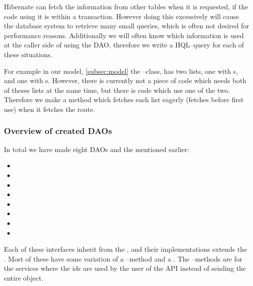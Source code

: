 Hibernate can fetch the information from other tables when it is requested, if the code using it is within a transaction.
However doing this excessively will cause the database system to retrieve many small queries, which is often not desired for performance reasons.
Additionally we will often know which information is used at the caller side of using the \ac{DAO},
therefore we write a \ac{HQL}--query for each of these situations.

For example in our model, \cref{subsec:model} the --class, has two lists,
one with s, and one with s.
However, there is currently not a piece of code which needs both of theses lists at the same time, but there is code which use one of the two.
Therefore we make a method which fetches each list eagerly (fetches before first use) when it fetches the route.

\subsubsection*{Overview of created \acp{DAO}}
In total we have made eight \acp{DAO} and the  mentioned earlier:
\begin{multicols}{2}
\begin{itemize}
    \item {}
    \item {}
    \item {}
    \item {}
    \item {}
    \item {}
    \item {}
    \item {}
\end{itemize}
\end{multicols}

Each of these interfaces inherit from the , and their implementations extends the .
Most of these have some variation of a --method and a .
The --methods are for the services where the ids are used by the user of the API instead of sending the entire object.

